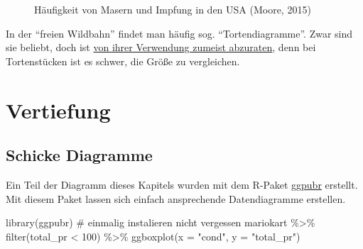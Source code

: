 \documentclass[
  letterpaper,
]{scrbook}
\newenvironment{Shaded}{\begin{snugshade}}{\end{snugshade}}
\newcommand{\AttributeTok}[1]{\textcolor[rgb]{0.40,0.45,0.13}{#1}}
\newcommand{\CommentTok}[1]{\textcolor[rgb]{0.37,0.37,0.37}{#1}}
\newcommand{\DecValTok}[1]{\textcolor[rgb]{0.68,0.00,0.00}{#1}}
\newcommand{\FunctionTok}[1]{\textcolor[rgb]{0.28,0.35,0.67}{#1}}
\newcommand{\NormalTok}[1]{\textcolor[rgb]{0.00,0.23,0.31}{#1}}
\newcommand{\SpecialCharTok}[1]{\textcolor[rgb]{0.37,0.37,0.37}{#1}}
\newcommand{\StringTok}[1]{\textcolor[rgb]{0.13,0.47,0.30}{#1}}
\theoremstyle{definition}
\theoremstyle{definition}
\theoremstyle{definition}
\theoremstyle{remark}
\begin{document}
\begin{figure}


\caption{\label{fig-vaccine}Häufigkeit von Masern und Impfung in den USA
(Moore, 2015)}

\end{figure}%

In der \enquote{freien Wildbahn} findet man häufig sog.
\enquote{Tortendiagramme}. Zwar sind sie beliebt, doch ist
\href{https://www.data-to-viz.com/caveat/pie.html}{von ihrer Verwendung
zumeist abzuraten}, denn bei Tortenstücken ist es schwer, die Größe zu
vergleichen.

\section{Vertiefung}\label{vertiefung-4}

\subsection{Schicke Diagramme}\label{schicke-diagramme}

Ein Teil der Diagramm dieses Kapitels wurden mit dem R-Paket
\href{https://rpkgs.datanovia.com/ggpubr/}{ggpubr} erstellt. Mit diesem
Paket lassen sich einfach ansprechende Datendiagramme erstellen.

\begin{Shaded}
\begin{Highlighting}[]
\FunctionTok{library}\NormalTok{(ggpubr)  }\CommentTok{\# einmalig instalieren nicht vergessen}
\NormalTok{mariokart }\SpecialCharTok{\%\textgreater{}\%} 
  \FunctionTok{filter}\NormalTok{(total\_pr }\SpecialCharTok{\textless{}} \DecValTok{100}\NormalTok{) }\SpecialCharTok{\%\textgreater{}\%} 
  \FunctionTok{ggboxplot}\NormalTok{(}\AttributeTok{x =} \StringTok{"cond"}\NormalTok{, }\AttributeTok{y =} \StringTok{"total\_pr"}\NormalTok{)}
\end{Highlighting}
\end{Shaded}
\end{document}
